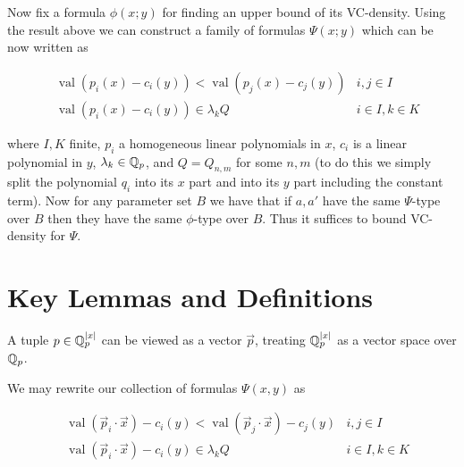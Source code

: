 \documentclass{amsart}
\DeclareMathOperator{\val}{val}
\begin{document}
Now fix a formula $\phi(x; y)$ for finding an upper bound of its VC-density.
Using the result above we can construct a family of formulas $\Psi(x; y)$ which can be now written as

\begin{align*}
	&\val (p_i(x) - c_i(y)) < \val (p_j(x) - c_j(y)) & i, j \in I \\
	&\val (p_i(x) - c_i(y)) \in \lambda_k Q & i \in I , k \in K
\end{align*}

where $I, K$ finite,
$p_i$ a homogeneous linear polynomials in $x$,
$c_i$ is a linear polynomial in $y$,
$\lambda_k \in \mathbb{Q}_p$, and
$Q = Q_{n,m}$ for some $n,m$
(to do this we simply split the polynomial $q_i$ into its $x$ part and into its $y$ part including the constant term).
Now for any parameter set $B$ we have that if $a, a'$ have the same $\Psi$-type over $B$ then they have the same $\phi$-type over $B$.
Thus it suffices to bound VC-density for $\Psi$.


\section{Key Lemmas and Definitions}

\begin{Definition}
	A tuple $p \in  \mathbb{Q}_p^{|x|}$ can be viewed as a vector $\vec p$, treating $\mathbb{Q}_p^{|x|}$ as a vector space over $\mathbb{Q}_p$.
\end{Definition}

We may rewrite our collection of formulas $\Psi(x, y)$ as

\begin{align*}
	&\val (\vec p_i \cdot \vec x) - c_i(y) < \val (\vec p_j \cdot \vec x) - c_j(y) & i, j \in I \\
	&\val (\vec p_i \cdot \vec x) - c_i(y) \in \lambda_k Q & i \in I , k \in K
\end{align*}
\end{document}
